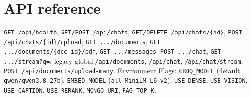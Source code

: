 \documentclass[11pt,a4paper]{article}
\begin{document}
\appendix
\section{API reference}
\texttt{GET /api/health}, \texttt{GET/POST /api/chats}, \texttt{GET/DELETE /api/chats/\{id\}},
\texttt{POST /api/chats/\{id\}/upload}, \texttt{GET .../documents}, \texttt{GET .../documents/\{doc\_id\}/pdf},
\texttt{GET .../messages}, \texttt{POST .../chat}, \texttt{GET .../stream?q=}; legacy global \texttt{/api/documents},
\texttt{/api/chat}, \texttt{/api/chat/stream}, \texttt{POST /api/documents/upload-many}.
Environment Flags: \texttt{GROQ\_MODEL} (default \texttt{qwen/qwen3.8-27b}), \texttt{EMBED\_MODEL} (\texttt{all-MiniLM-L6-v2}),
\texttt{USE\_DENSE}, \texttt{USE\_VISION}, \texttt{USE\_CAPTION}, \texttt{USE\_RERANK}, \texttt{MONGO\_URI}, \texttt{RAG\_TOP\_K}.
\end{document}
